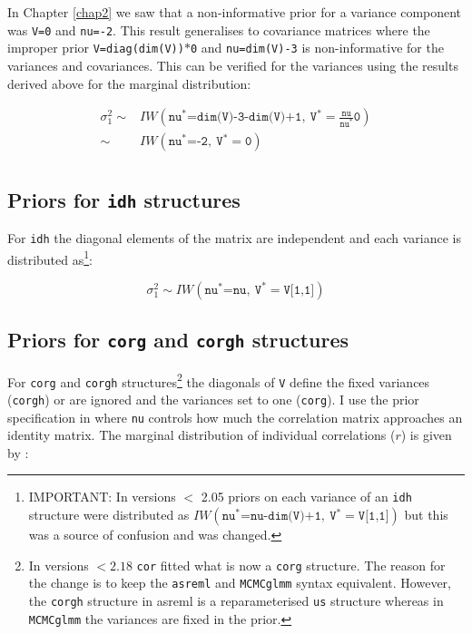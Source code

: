 \documentclass{article}
\begin{document}
In Chapter \ref{chap2} we saw that a non-informative prior for a variance component was \texttt{V=0} and \texttt{nu=-2}. This result generalises to covariance matrices where the improper prior \texttt{V=diag(dim(V))$\ast$0} and \texttt{nu=dim(V)-3} is non-informative for the variances and covariances. This can be verified for the variances using the results derived above for the marginal distribution:

\begin{displaymath}
\begin{array}{rl}
\sigma^{2}_{1} \sim& IW\left(\texttt{nu}^{\ast}\texttt{=dim(V)-3-dim(V)+1},\ \texttt{V}^{\ast}=\frac{\texttt{nu}}{\texttt{nu}^{\ast}}\texttt{0}\right)\\
               \sim& IW\left(\texttt{nu}^{\ast}\texttt{=-2},\ \texttt{V}^{\ast}=\texttt{0}\right)\\

\end{array}
\end{displaymath}

\subsection{Priors for \texttt{idh} structures}

For \texttt{idh} the diagonal elements of the matrix are independent and each variance is distributed as\footnote{IMPORTANT: In versions $<$ 2.05 priors on each variance of an \texttt{idh} structure were distributed as $IW\left(\texttt{nu}^{\ast}\texttt{=nu-dim(V)+1},\ \texttt{V}^{\ast}=\texttt{V[1,1]}\right)$ but this was a source of confusion and was changed.}:

\begin{displaymath}
\sigma^{2}_{1} \sim IW\left(\texttt{nu}^{\ast}\texttt{=nu},\ \texttt{V}^{\ast}=\texttt{V[1,1]}\right)
\end{displaymath}


\subsection{Priors for \texttt{corg} and \texttt{corgh} structures}

For \texttt{corg} and \texttt{corgh} structures\footnote{In versions $<2.18$ \texttt{cor} fitted what is now a \texttt{corg} structure. The reason for the change is to keep the \texttt{asreml} and  \texttt{MCMCglmm} syntax equivalent. However, the \texttt{corgh} structure in asreml is a reparameterised \texttt{us} structure whereas in \texttt{MCMCglmm} the variances are fixed in the prior.} the diagonals of \texttt{V} define the fixed variances (\texttt{corgh}) or are ignored and the variances set to one (\texttt{corg}). I use the prior specification in \citet{Barnard.2000} where \texttt{nu} controls how much the correlation matrix approaches an identity matrix.  The marginal distribution of individual correlations ($r$) is given by \citet{Barnard.2000}   \citep[and][]{Box.1973}:
\end{document}

